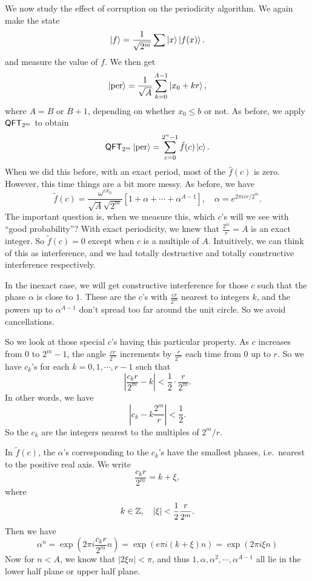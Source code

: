 We now study the effect of corruption on the periodicity algorithm. We again make the state
\[
  \left\lvert f\right\rangle = \frac{1}{\sqrt{2^m}} \sum \left\lvert x\right\rangle \left\lvert f(x)\right\rangle.
\]
and measure the value of $f$. We then get
\[
  \left\lvert \mathrm{per}\right\rangle = \frac{1}{\sqrt{A}} \sum_{k = 0}^{A - 1} \left\lvert x_0 + kr\right\rangle,
\]
where $A = B$ or $B + 1$, depending on whether $x_0 \leq b$ or not. As before, we apply $\mathsf{QFT}_{2^m}$ to obtain
\[
  \mathsf{QFT}_{2^m}\left\lvert \mathrm{per}\right\rangle = \sum_{c = 0}^{2^n - 1} \tilde{f}(c) \left\lvert c\right\rangle.
\]
When we did this before, with an exact period, most of the $\hat{f}(c)$ is zero. However, this time things are a bit more messy. As before, we have
\[
  \tilde{f}(c) = \frac{\omega^{c x_0}}{\sqrt{A}\sqrt{2^m}} [1 + \alpha + \cdots + \alpha^{A - 1}],\quad \alpha = e^{2\pi i cr/2^m}.
\]
The important question is, when we measure this, which $c$'s will we see with ``good probability''? With exact periodicity, we knew that $\frac{2^m}{r} = A$ is an exact integer. So $\tilde{f}(c) = 0$ except when $c$ is a multiple of $A$. Intuitively, we can think of this as interference, and we had totally destructive and totally constructive interference respectively.

In the inexact case, we will get constructive interference for those $c$ such that the phase $\alpha$ is close to $1$. These are the $c$'s with $\frac{cr}{2^m}$ nearest to integers $k$, and the powers up to $\alpha^{A - 1}$ don't spread too far around the unit circle. So we avoid cancellations.

So we look at those special $c$'s having this particular property. As $c$ increases from $0$ to $2^m - 1$, the angle $\frac{cr}{2^m}$ increments by $\frac{r}{2^m}$ each time from $0$ up to $r$. So we have $c_k$'s for each $k = 0, 1, \cdots, r - 1$ such that
\[
  \left|\frac{c_k r}{2^m} - k\right| < \frac{1}{2} \cdot \frac{r}{2^m}.
\]
In other words, we have
\[
  \left|c_k - k\frac{2^m}{r}\right| < \frac{1}{2}.
\]
So the $c_k$ are the integers nearest to the multiples of $2^m/r$.

In $\tilde{f}(c)$, the $\alpha$'s corresponding to the $c_k$'s have the smallest phases, i.e.\ nearest to the positive real axis. We write
\[
  \frac{c_k r}{2^m} = k + \xi,
\]
where
\[
  k \in \mathbb{Z},\quad |\xi| < \frac{1}{2} \frac{r}{2^m}.
\]
Then we have
\[
  \alpha^n = \exp\left(2\pi i \frac{c_k r}{2^m}n\right) = \exp\left(e\pi i(k + \xi)n\right) = \exp(2 \pi i \xi n)
\]
Now for $n < A$, we know that $|2 \xi n| < \pi$, and thus $1, \alpha, \alpha^2, \cdots, \alpha^{A - 1}$ all lie in the lower half plane or upper half plane.

